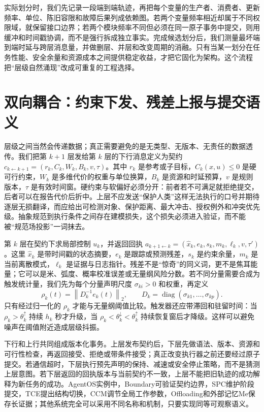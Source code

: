 实际划分时，我们先记录一段端到端轨迹，再把每个变量的生产者、消费者、更新频率、单位、陈旧容限和故障后果列成依赖图。若两个变量频率相近却属于不同权限域，就保留接口边界；若两个模块频率不同但必须在同一原子事务中提交，则用缓冲和时间戳协调，而不是强行拆成独立事实。完成候选划分后，我们测量最坏端到端时延与跨层消息量，并做删层、并层和改变周期的消融。只有当某一划分在任务性能、安全余量和资源成本之间提供稳定收益，才把它固化为架构。这个流程把“层级自然涌现”改成可重复的工程选择。

\section{双向耦合：约束下发、残差上报与提交语义}
\label{sec:hierarchical_coupling_mechanisms}

层级之间当然会传递数据；真正需要避免的是无类型、无版本、无责任的数据透传。我们把第 $k+1$ 层发给第 $k$ 层的下行消息定义为契约 $c_{k\leftarrow k+1}=(r_k,C_k,W_k,B_k,v,\tau)$。其中 $r_k$ 是参考或子目标，$C_k(x,u)\leq0$ 是硬可行约束，$W_k$ 是多维代价的权重与单位换算，$B_k$ 是资源和时延预算，$v$ 是规则版本，$\tau$ 是有效时间窗。硬约束与软偏好必须分开：前者若不可满足就拒绝提交，后者可以在报告代价后折中。上层不应发送“保护人类”这样无法执行的口号并期待逐层无损翻译，而应给出可检测对象、保护距离、最大冲击、授权例外和冲突优先级。抽象规范到执行条件之间存在建模损失，这个损失必须进入验证，而不能被“规范场投影”一词抹去。

第 $k$ 层在契约下求局部控制 $u_k$，并返回回执 $a_{k+1\leftarrow k}=(\hat x_k,e_k,s_k,m_k,\ell_k,v,\tau')$。这里 $\hat x_k$ 是带时间戳的状态摘要，$e_k$ 是跟踪或预测残差，$s_k$ 是约束余量，$m_k$ 是当前离散模式，$\ell_k$ 是证据与日志指针。残差不是“惊奇”的同义词，更不是焦耳能量；它可以是米、弧度、概率校准误差或无量纲风险分数。若不同分量需要合成为触发统计量，我们先为每个分量声明尺度 $\sigma_{ki}>0$ 和权重，再定义
\begin{equation}
 \rho_k(t)=\left\|D_k^{-1}e_k(t)\right\|_2,
 \qquad D_k=\operatorname{diag}(\sigma_{k1},\ldots,\sigma_{kp}).
\end{equation}
只有经过归一化的 $\rho_k$ 才能与无量纲阈值比较。触发器还应带滞回和驻留时间：当 $\rho_k>\theta_k^{\uparrow}$ 持续 $h_k$ 秒才升级，当 $\rho_k<\theta_k^{\downarrow}<\theta_k^{\uparrow}$ 持续恢复窗后才降级。这样可以避免噪声在阈值附近造成层级抖振。

下行和上行共同组成版本化事务。上层发布契约后，下层先做语法、版本、资源和可行性检查，再返回接受、拒绝或带条件接受；真正改变执行器之前还要经过原子提交。若通信超时，下层执行预先声明的保持、减速或安全停止策略，而不是猜测上层意图。若下层返回的回执版本与当前契约不一致，上层不能把旧轨迹的成功解释为新任务的成功。AgentOS实例中，Boundary可验证契约边界，SPC维护阶段提交，TCE提出结构切换，CCM调节全局工作参数，Offloading和外部记忆Me保存长证据；其他系统完全可以采用不同名称和机制，只要实现同等可观察语义。

